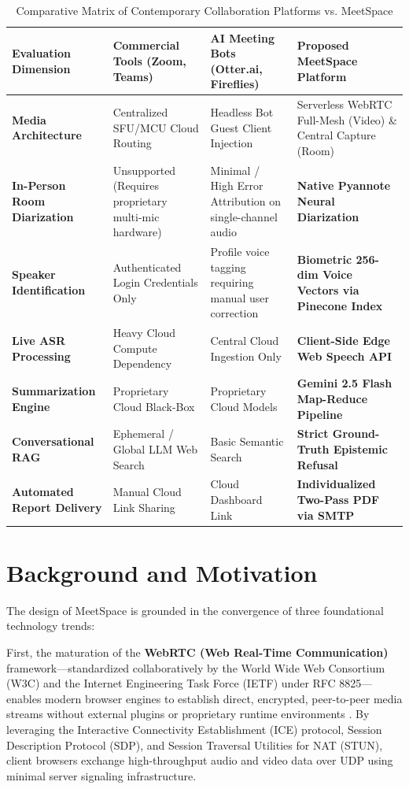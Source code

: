 \documentclass[12pt,oneside,letterpaper]{report}
\numberwithin{equation}{chapter} %
\begin{document}
\begin{table}[H]
\centering
\caption{Comparative Matrix of Contemporary Collaboration Platforms vs. MeetSpace}
\label{tab:comparison_matrix}
\footnotesize
\begin{tabularx}{\textwidth}{p{3.2cm}X X X}
\toprule
\textbf{Evaluation Dimension} & \textbf{Commercial Tools (Zoom, Teams)} & \textbf{AI Meeting Bots (Otter.ai, Fireflies)} & \textbf{Proposed MeetSpace Platform} \\
\midrule
\textbf{Media Architecture} & Centralized SFU/MCU Cloud Routing & Headless Bot Guest Client Injection & Serverless WebRTC Full-Mesh (Video) \& Central Capture (Room) \\
\addlinespace
\textbf{In-Person Room Diarization} & Unsupported (Requires proprietary multi-mic hardware) & Minimal / High Error Attribution on single-channel audio & \textbf{Native Pyannote Neural Diarization} \\
\addlinespace
\textbf{Speaker Identification} & Authenticated Login Credentials Only & Profile voice tagging requiring manual user correction & \textbf{Biometric 256-dim Voice Vectors via Pinecone Index} \\
\addlinespace
\textbf{Live ASR Processing} & Heavy Cloud Compute Dependency & Central Cloud Ingestion Only & \textbf{Client-Side Edge Web Speech API} \\
\addlinespace
\textbf{Summarization Engine} & Proprietary Cloud Black-Box & Proprietary Cloud Models & \textbf{Gemini 2.5 Flash Map-Reduce Pipeline} \\
\addlinespace
\textbf{Conversational RAG} & Ephemeral / Global LLM Web Search & Basic Semantic Search & \textbf{Strict Ground-Truth Epistemic Refusal} \\
\addlinespace
\textbf{Automated Report Delivery} & Manual Cloud Link Sharing & Cloud Dashboard Link & \textbf{Individualized Two-Pass PDF via SMTP} \\
\bottomrule
\end{tabularx}
\end{table}

\section{Background and Motivation}
The design of MeetSpace is grounded in the convergence of three foundational technology trends:

First, the maturation of the \textbf{WebRTC (Web Real-Time Communication)} framework---standardized collaboratively by the World Wide Web Consortium (W3C) and the Internet Engineering Task Force (IETF) under RFC 8825---enables modern browser engines to establish direct, encrypted, peer-to-peer media streams without external plugins or proprietary runtime environments \cite{alvestrand2021overview}. By leveraging the Interactive Connectivity Establishment (ICE) protocol, Session Description Protocol (SDP), and Session Traversal Utilities for NAT (STUN), client browsers exchange high-throughput audio and video data over UDP using minimal server signaling infrastructure.
\end{document}
